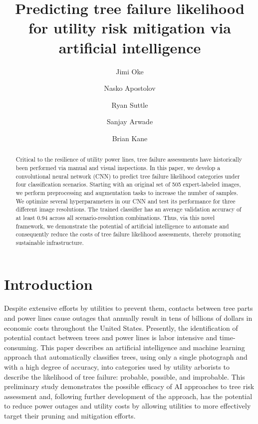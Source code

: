 \documentclass[Journal,letterpaper, SingleSpace, InsideFigs]{ascelike-new}
\begin{document}
\title{Predicting tree failure likelihood for utility risk mitigation via artificial intelligence}
\author[1]{Jimi Oke}
\author[1]{Nasko Apostolov}
\author[2]{Ryan Suttle}
\author[1]{Sanjay Arwade}
\author[2]{Brian Kane}


\maketitle

\begin{abstract}
  Critical to the resilience of utility power lines, tree failure assessments have historically been performed via
  manual and visual inspections.  In this paper, we develop a convolutional neural network (CNN) to predict tree failure
  likelihood categories under four classification scenarios.  Starting with an original set of 505 expert-labeled images, we perform
  preprocessing and augmentation tasks to increase the number of samples. We optimize several hyperparameters in our CNN
  and test its performance for three different image resolutions. The trained classifier has an average validation
  accuracy of at least 0.94 across all scenario-resolution combinations.  Thus, via this novel framework, we
  demonstrate the potential of artificial intelligence to automate and consequently reduce the costs of tree failure
  likelihood assessments, thereby promoting sustainable infrastructure.
\end{abstract}

\section{Introduction}
Despite extensive efforts by utilities to prevent them, contacts between tree parts and power lines cause outages that annually result in tens of billions of dollars in economic costs throughout the United States.  Presently, the identification of potential contact between trees and power lines is labor intensive and time-consuming.  This paper describes an artificial intelligence and machine learning approach that automatically classifies trees, using only a single photograph and with a high degree of accuracy, into categories used by utility arborists to describe the likelihood of tree failure: probable, possible, and improbable.  This preliminary study demonstrates the possible efficacy of AI approaches to tree risk assessment and, following further development of the approach, has the potential to reduce power outages and utility costs by allowing utilities to more effectively target their pruning and mitigation efforts.  
\end{document}
